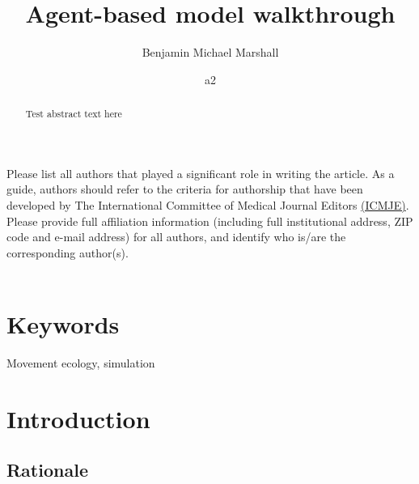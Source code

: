 \documentclass[10pt,a4paper]{article}
\begin{document}
\pagestyle{fancy}

\title{Agent-based model walkthrough}
\author[1]{Benjamin Michael Marshall}
\author[2]{a2}

\maketitle
\thispagestyle{fancy}

Please list all authors that played a significant role in writing the article. As a guide, authors should refer to the criteria for authorship that have been developed by The International Committee of Medical Journal Editors \href{http://www.icmje.org/recommendations/browse/roles-and-responsibilities/defining-the-role-of-authors-and-contributors.html}{(ICMJE)}. Please provide full affiliation information (including full institutional address, ZIP code and e-mail address) for all authors, and identify who is/are the corresponding author(s).
\\
\\
\begin{abstract}

Test abstract text here

\end{abstract}

\section*{\color{f1ROrange}Keywords}

Movement ecology, simulation

\clearpage
\pagestyle{fancy}

\hypertarget{main}{%
\section{Introduction}\label{main}}

\hypertarget{rationale}{%
\subsection{Rationale}\label{rationale}}
\end{document}
